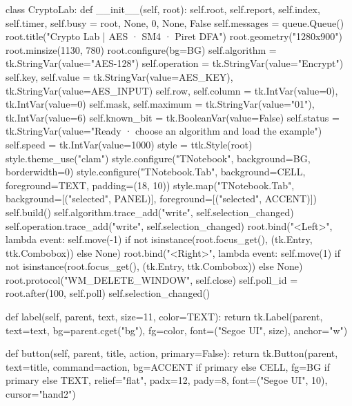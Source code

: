 \begin{lightcode}[numbers=left,firstnumber=1]
class CryptoLab:
    def __init__(self, root):
        self.root, self.report, self.index, self.timer, self.busy = root, None, 0, None, False
        self.messages = queue.Queue()
        root.title("Crypto Lab | AES · SM4 · Piret DFA")
        root.geometry("1280x900")
        root.minsize(1130, 780)
        root.configure(bg=BG)
        self.algorithm = tk.StringVar(value="AES-128")
        self.operation = tk.StringVar(value="Encrypt")
        self.key, self.value = tk.StringVar(value=AES_KEY), tk.StringVar(value=AES_INPUT)
        self.row, self.column = tk.IntVar(value=0), tk.IntVar(value=0)
        self.mask, self.maximum = tk.StringVar(value="01"), tk.IntVar(value=6)
        self.known_bit = tk.BooleanVar(value=False)
        self.status = tk.StringVar(value="Ready · choose an algorithm and load the example")
        self.speed = tk.IntVar(value=1000)
        style = ttk.Style(root)
        style.theme_use("clam")
        style.configure("TNotebook", background=BG, borderwidth=0)
        style.configure("TNotebook.Tab", background=CELL, foreground=TEXT, padding=(18, 10))
        style.map("TNotebook.Tab", background=[("selected", PANEL)], foreground=[("selected", ACCENT)])
        self.build()
        self.algorithm.trace_add("write", self.selection_changed)
        self.operation.trace_add("write", self.selection_changed)
        root.bind("<Left>", lambda event: self.move(-1) if not isinstance(root.focus_get(), (tk.Entry, ttk.Combobox)) else None)
        root.bind("<Right>", lambda event: self.move(1) if not isinstance(root.focus_get(), (tk.Entry, ttk.Combobox)) else None)
        root.protocol("WM_DELETE_WINDOW", self.close)
        self.poll_id = root.after(100, self.poll)
        self.selection_changed()

    def label(self, parent, text, size=11, color=TEXT):
        return tk.Label(parent, text=text, bg=parent.cget("bg"), fg=color, font=("Segoe UI", size), anchor="w")

    def button(self, parent, title, action, primary=False):
        return tk.Button(parent, text=title, command=action, bg=ACCENT if primary else CELL, fg=BG if primary else TEXT, relief="flat", padx=12, pady=8, font=("Segoe UI", 10), cursor="hand2")


\end{lightcode}
